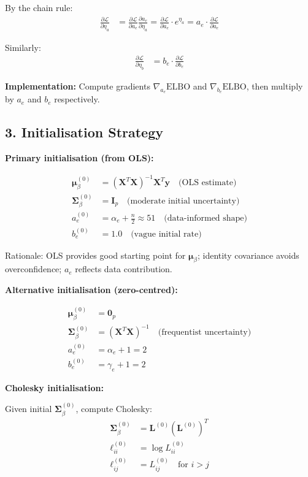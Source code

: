 \documentclass[11pt]{article}
\newcommand{\ELBO}{\text{ELBO}}
\begin{document}
By the chain rule:
\begin{align}
\frac{\partial \mathcal{L}}{\partial \eta_a} &= \frac{\partial \mathcal{L}}{\partial a_e} \frac{\partial a_e}{\partial \eta_a} = \frac{\partial \mathcal{L}}{\partial a_e} \cdot e^{\eta_a} = a_e \cdot \frac{\partial \mathcal{L}}{\partial a_e}
\end{align}

Similarly:
\begin{align}
\frac{\partial \mathcal{L}}{\partial \eta_b} &= b_e \cdot \frac{\partial \mathcal{L}}{\partial b_e}
\end{align}

\textbf{Implementation:} Compute gradients $\nabla_{a_e} \ELBO$ and $\nabla_{b_e} \ELBO$, then multiply by $a_e$ and $b_e$ respectively.

\subsection*{3. Initialisation Strategy}

\textbf{Primary initialisation (from OLS):}

\begin{align}
\bm{\mu}_\beta^{(0)} &= (\bm{X}^T \bm{X})^{-1} \bm{X}^T \bm{y} \quad \text{(OLS estimate)}\\
\bm{\Sigma}_\beta^{(0)} &= \bm{I}_p \quad \text{(moderate initial uncertainty)}\\
a_e^{(0)} &= \alpha_e + \frac{n}{2} \approx 51 \quad \text{(data-informed shape)}\\
b_e^{(0)} &= 1.0 \quad \text{(vague initial rate)}
\end{align}

Rationale: OLS provides good starting point for $\bm{\mu}_\beta$; identity covariance avoids overconfidence; $a_e$ reflects data contribution.

\textbf{Alternative initialisation (zero-centred):}

\begin{align}
\bm{\mu}_\beta^{(0)} &= \bm{0}_p\\
\bm{\Sigma}_\beta^{(0)} &= (\bm{X}^T \bm{X})^{-1} \quad \text{(frequentist uncertainty)}\\
a_e^{(0)} &= \alpha_e + 1 = 2\\
b_e^{(0)} &= \gamma_e + 1 = 2
\end{align}

\textbf{Cholesky initialisation:}

Given initial $\bm{\Sigma}_\beta^{(0)}$, compute Cholesky:
\begin{align}
\bm{\Sigma}_\beta^{(0)} &= \bm{L}^{(0)} (\bm{L}^{(0)})^T\\
\ell_{ii}^{(0)} &= \log L_{ii}^{(0)}\\
\ell_{ij}^{(0)} &= L_{ij}^{(0)} \quad \text{for } i > j
\end{align}
\end{document}
